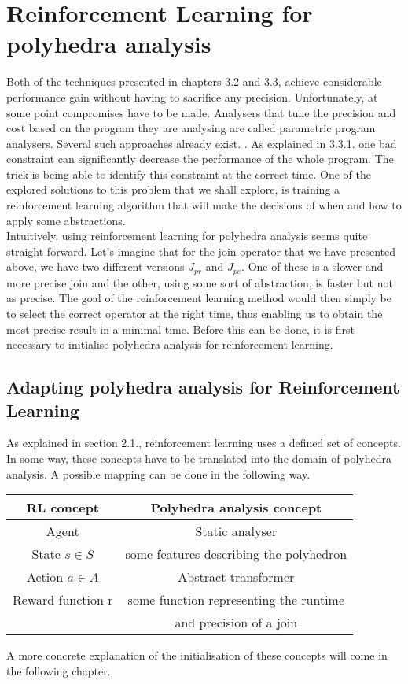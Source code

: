 \section{Reinforcement Learning for polyhedra analysis}
Both of the techniques presented in chapters 3.2 and 3.3, achieve considerable performance gain without having to sacrifice any precision. Unfortunately, at some point compromises have to be made. Analysers that tune the precision and cost based on the program they are analysing are called parametric program analysers. Several such approaches already exist. \cite{oh2015learning,liang2011learning,heo2016learning}.
As explained in 3.3.1. one bad constraint can significantly decrease the performance of the whole program. The trick is being able to identify this constraint at the correct time. One of the explored solutions to this problem that we shall explore, is training a reinforcement learning algorithm  that will make the decisions of when and how to apply some abstractions\cite{singh2018fast}.\\
Intuitively, using reinforcement learning for polyhedra analysis seems quite straight forward. Let's imagine that for the join operator that we have presented above, we have two different versions $J_{pr}$ and $J_{pe}$. One of these is a slower and more precise join and the other, using some sort of abstraction, is faster but not as precise. The goal of the reinforcement learning method would then simply be to select the correct operator at the right time, thus enabling us to obtain the most precise result in a minimal time. Before this can be done, it is first necessary to initialise polyhedra analysis for reinforcement learning.

\subsection{Adapting polyhedra analysis for Reinforcement Learning}
As explained in section 2.1., reinforcement learning uses a defined set of concepts. In some way, these concepts have to be translated into the domain of polyhedra analysis. A possible mapping can be done in the following way.
\begin{center}
\begin{tabular}{||c c||} 
 \hline
 RL concept & Polyhedra analysis concept  \\ [0.5ex] 
 \hline
 \hline
 Agent & Static analyser\\ 

 State $s\in S$ & some features describing the polyhedron\\

 Action $a \in A$ & Abstract transformer \\
 
 Reward function r & some function representing the runtime\\
 
  & and precision of a join\\
 \hline
\end{tabular}
\end{center}
A more concrete explanation of the initialisation of these concepts will come in the following chapter.

